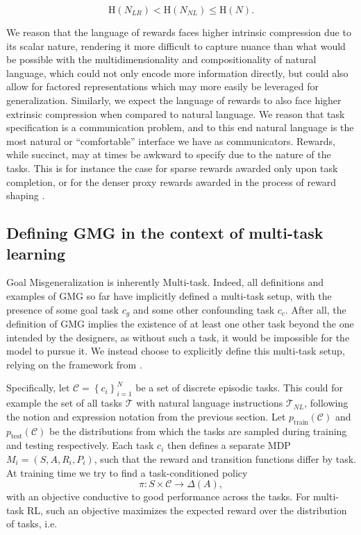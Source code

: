 \documentclass[../main.tex]{subfiles}
\begin{document}
\begin{equation}
	\text{H}(N_{LR})	< \text{H}(N_{NL}) \leq \text{H}(N).
\end{equation}

We reason that the language of rewards faces higher intrinsic compression due to its scalar nature,
rendering it more difficult to capture nuance than what would be possible with the
multidimensionality and compositionality of natural language, which could not only encode more
information directly, but could also allow for factored representations which may more easily be
leveraged for generalization. Similarly, we expect the language of rewards to also face higher
extrinsic compression when compared to natural language. We reason that task specification is
a communication problem, and to this end natural language is the most natural or ``comfortable''
interface we have as communicators. Rewards, while succinct, may at times be awkward to specify due
to the nature of the tasks. This is for instance the case for sparse rewards awarded only upon task
completion, or for the denser proxy rewards awarded in the process of reward shaping
\citep{ng_policy_1999}.

\subsection{Defining GMG in the context of multi-task learning}\label{prel:sec:gmg}

Goal Misgeneralization is inherently Multi-task. Indeed, all definitions and examples of GMG so far
have implicitly defined a multi-task setup, with the presence of some goal task $c_g$ and some other
confounding task $c_c$. After all, the definition of GMG implies the existence of at least one other
task beyond the one intended by the designers, as without such a task, it would be impossible for
the model to pursue it. We instead choose to explicitly define this multi-task setup, relying on the
framework from \citet{wilson_multi-task_2007}.

Specifically, let $\mathcal{C} = \left\{c_i\right\}_{i=1}^N$ be a set of discrete episodic tasks.
This could for example the set of all tasks $\mathcal{T}$ with natural language instructions
$\mathcal{T}_{NL}$, following the notion and expression notation from the previous section. Let
$p_\text{train}(\mathcal{C})$ and $p_\text{test}(\mathcal{C})$ be the distributions from which the
tasks are sampled during training and testing respectively. Each task $c_i$ then defines a separate
MDP $M_i = (S, A, R_i, P_i)$, such that the reward and transition functions differ by task. At
training time we try to find a task-conditioned policy \begin{equation*} \pi : S \times \mathcal{C}
	\rightarrow \Delta (A), \end{equation*} with an objective conductive to good performance across the
tasks. For multi-task RL, such an objective maximizes the expected reward over the distribution of
tasks, i.e.
\end{document}
